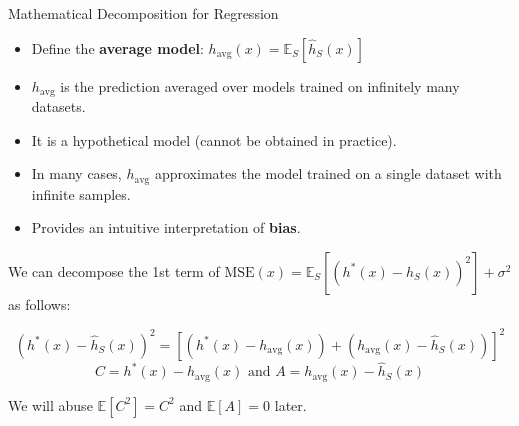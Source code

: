 \documentclass{beamer}
\begin{document}
\begin{frame}{Mathematical Decomposition for Regression}
    \begin{itemize}
        \item Define the \textbf{average model}: $h_{\text{avg}}(x) = \mathbb{E}_S [\hat{h}_S(x)]$
        \item $h_{\text{avg}}$ is the prediction averaged over models trained on infinitely many datasets.
        \item It is a hypothetical model (cannot be obtained in practice).
        \item In many cases, $h_{\text{avg}}$ approximates the model trained on a single dataset with infinite samples.
        \item Provides an intuitive interpretation of \textbf{bias}.
    \end{itemize}

    We can decompose the 1st term of  $\text{MSE}(x) =\mathbb{E}_S \left[ (h^*(x) - \hat{h}_S(x))^2 \right]  + \sigma^2$ as follows:

    \[
        \boxed{(h^*(x) - \hat{h}_S(x))^2 = [(h^*(x) - h_{\text{avg}}(x)) +  (h_{\text{avg}}(x) - \hat{h}_S(x))]^2}
    \]
    \[
        C =h^*(x) - h_{\text{avg}}(x) \text{ and } A = h_{\text{avg}}(x) - \hat{h}_S(x)
    \]

    We will abuse $\mathbb{E}[C^2] = C^2$ and $\mathbb{E}[A]=0 $ later.
\end{frame}
\end{document}
